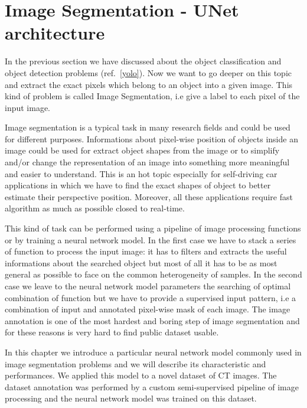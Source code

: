 \documentclass{standalone}
\begin{document}
\section[UNet]{Image Segmentation - UNet architecture}\label{unet}


In the previous section we have discussed about the object classification and object detection problems (ref.~\ref{yolo}).
Now we want to go deeper on this topic and extract the exact pixels which belong to an object into a given image.
This kind of problem is called Image Segmentation, i.e give a label to each pixel of the input image.

Image segmentation is a typical task in many research fields and could be used for different purposes.
Informations about pixel-wise position of objects inside an image could be used for extract object shapes from the image or to simplify and/or change the representation of an image into something more meaningful and easier to understand.
This is an hot topic especially for self-driving car applications in which we have to find the exact shapes of object to better estimate their perspective position.
Moreover, all these applications require fast algorithm as much as possible closed to real-time.

This kind of task can be performed using a pipeline of image processing functions or by training a neural network model.
In the first case we have to stack a series of function to process the input image: it has to filters and extracts the useful informations about the searched object but most of all it has to be as most general as possible to face on the common heterogeneity of samples.
In the second case we leave to the neural network model parameters the searching of optimal combination of function but we have to provide a supervised input pattern, i.e a combination of input and annotated pixel-wise mask of each image.
The image annotation is one of the most hardest and boring step of image segmentation and for these reasons is very hard to find public dataset usable.

In this chapter we introduce a particular neural network model commonly used in image segmentation problems and we will describe its characteristic and performances.
We applied this model to a novel dataset of CT images.
The dataset annotation was performed by a custom semi-supervised pipeline of image processing and the neural network model was trained on this dataset.
\end{document}
